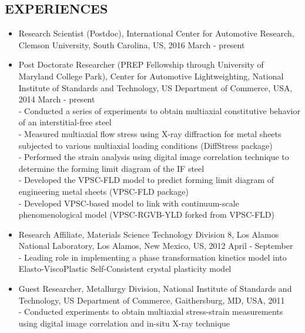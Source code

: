 \documentclass{res}
\begin{document}
\begin{resume}
  \section{EXPERIENCES}
  \begin{itemize}
  \item Research Scientist (Postdoc), International Center for Automotive Research, Clemson University, South Carolina, US, 2016 March - present
  \item Post Doctorate Researcher (PREP Fellowship through University of Maryland College Park), Center for Automotive Lightweighting,
    National Institute of Standards and Technology, US Department of Commerce, USA, 2014 March - present\\
    - Conducted a series of experiments to obtain multiaxial constitutive behavior of an interstitial-free steel\\
    - Measured multiaxial flow stress using X-ray diffraction for metal sheets subjected to various multiaxial loading conditions (DiffStress package)\\
    - Performed the strain analysis using digital image correlation technique to determine the forming limit diagram of the IF steel\\
    - Developed the VPSC-FLD model to predict forming limit diagram of engineering metal sheets (VPSC-FLD package)\\
    - Developed VPSC-based model to link with continuum-scale phenomenological model (VPSC-RGVB-YLD forked from VPSC-FLD)
  \item Research Affiliate, Materials Science Technology Division 8, Los Alamos National Laboratory, Los Alamos, New Mexico, US, 2012 April - September \\
    - Leading role in implementing a phase transformation kinetics model into Elasto-ViscoPlastic Self-Consistent crystal plasticity model
  \item Guest Researcher, Metallurgy Division, National Institute of Standards and Technology, US Department of Commerce, Gaithersburg, MD, USA, 2011\\
    - Conducted experiments to obtain multiaxial stress-strain measurements using digital image correlation and in-situ X-ray technique
  \end{itemize}


\end{resume}
\end{document}
